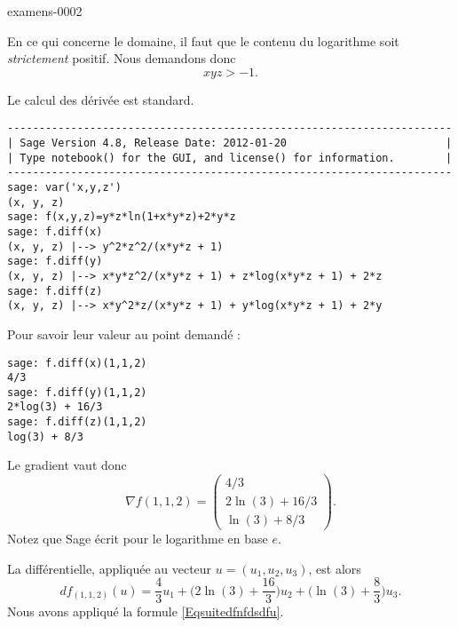 

\begin{corrige}{examens-0002}

    En ce qui concerne le domaine, il faut que le contenu du logarithme soit \emph{strictement} positif. Nous demandons donc
    \begin{equation}
        xyz>-1.
    \end{equation}

    Le calcul des dérivée est standard. 
    \begin{verbatim}
----------------------------------------------------------------------
| Sage Version 4.8, Release Date: 2012-01-20                         |
| Type notebook() for the GUI, and license() for information.        |
----------------------------------------------------------------------
sage: var('x,y,z')
(x, y, z)
sage: f(x,y,z)=y*z*ln(1+x*y*z)+2*y*z
sage: f.diff(x)
(x, y, z) |--> y^2*z^2/(x*y*z + 1)
sage: f.diff(y)
(x, y, z) |--> x*y*z^2/(x*y*z + 1) + z*log(x*y*z + 1) + 2*z
sage: f.diff(z)
(x, y, z) |--> x*y^2*z/(x*y*z + 1) + y*log(x*y*z + 1) + 2*y
    \end{verbatim}

Pour savoir leur valeur au point demandé :

    \begin{verbatim}
sage: f.diff(x)(1,1,2)         
4/3
sage: f.diff(y)(1,1,2)
2*log(3) + 16/3
sage: f.diff(z)(1,1,2)
log(3) + 8/3
    \end{verbatim}
    

    Le gradient vaut donc
    \begin{equation}
        \nabla f(1,1,2)=\begin{pmatrix}
            4/3\\ 
            2\ln(3)+16/3    \\ 
            \ln(3)+8/3    
        \end{pmatrix}.
    \end{equation}
    Notez que Sage écrit  pour le logarithme en base \( e\).

    La différentielle, appliquée au vecteur \( u=(u_1,u_2,u_3)\), est alors
    \begin{equation}
        df_{(1,1,2)}(u)=\frac{ 4 }{ 3 }u_1+\big( 2\ln(3)+\frac{ 16 }{ 3 } \big)u_2+\big( \ln(3)+\frac{ 8 }{ 3 } \big)u_3.
    \end{equation}
    Nous avons appliqué la formule \eqref{Eqsuitedfnfdsdfu}.
    
\end{corrige}
